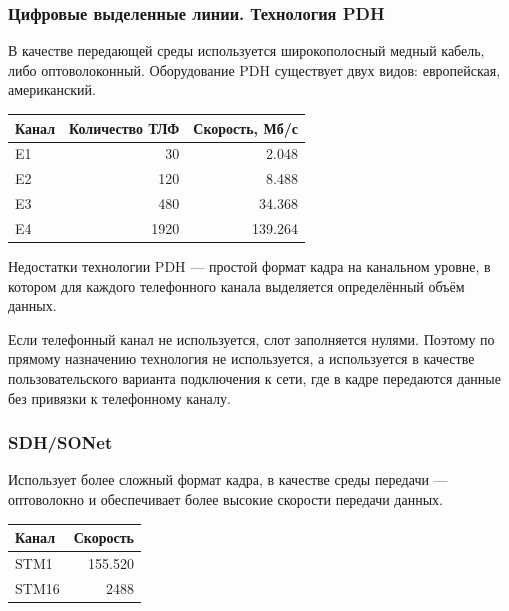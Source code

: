 \documentclass[12pt, russian, oneside, article]{ncc}
\begin{document}
\subsubsection{Цифровые выделенные линии. Технология PDH}
\label{sec-5_2_7}


В качестве передающей среды используется широкополосный медный кабель, либо оптоволоконный. Оборудование PDH существует двух видов: европейская, американский.


\begin{center}
\begin{tabular}{lrr}
 Канал  &  Количество ТЛФ  &  Скорость, Мб/с  \\
\hline
 E1     &              30  &           2.048  \\
 E2     &             120  &           8.488  \\
 E3     &             480  &          34.368  \\
 E4     &            1920  &         139.264  \\
\end{tabular}
\end{center}



Недостатки технологии PDH --- простой формат кадра на канальном уровне, в котором для каждого телефонного канала выделяется определённый объём данных.

Если телефонный канал не используется, слот заполняется нулями.
Поэтому по прямому назначению технология не используется, а используется в качестве пользовательского варианта подключения к сети, где в кадре передаются данные без привязки к телефонному каналу.
\subsubsection{SDH/SONet}
\label{sec-5_2_8}


Использует более сложный формат кадра, в качестве среды передачи --- оптоволокно и обеспечивает более высокие скорости передачи данных.


\begin{center}
\begin{tabular}{lr}
 Канал  &  Скорость  \\
\hline
 STM1   &   155.520  \\
 STM16  &      2488  \\
\end{tabular}
\end{center}
\end{document}
